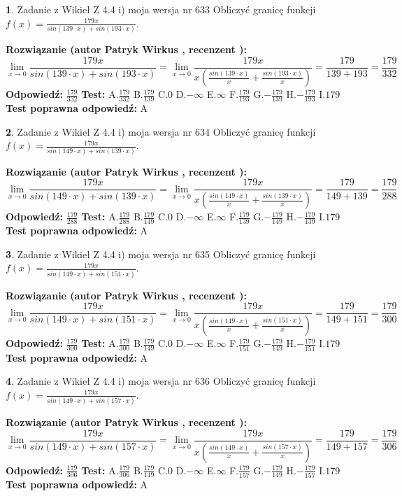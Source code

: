 \documentclass[12pt, a4paper]{article}
\theoremstyle{definition} %
\newtheorem{zad}{}
\newcommand{\zadStart}[1]{\begin{zad}#1\newline}
\newcommand{\zadStop}{\end{zad}}
\newcommand{\rozwStart}[2]{\noindent \textbf{Rozwiązanie (autor #1 , recenzent #2): }\newline}
\newcommand{\rozwStop}{\newline}
\newcommand{\odpStart}{\noindent \textbf{Odpowiedź:}\newline}
\newcommand{\odpStop}{\newline}
\newcommand{\testStart}{\noindent \textbf{Test:}\newline}
\newcommand{\testStop}{\newline}
\newcommand{\kluczStart}{\noindent \textbf{Test poprawna odpowiedź:}\newline}
\newcommand{\kluczStop}{\newline}
\begin{document}
\zadStart{Zadanie z Wikieł Z 4.4 i) moja wersja nr 633}
Obliczyć granicę funkcji $f(x)=\frac{179x}{sin(139\cdot x) +sin(193\cdot x)}$.
\zadStop
\rozwStart{Patryk Wirkus}{}
$$\lim\limits_{x\to 0}\frac{179x}{sin(139\cdot x) +sin(193\cdot x)}=\lim\limits_{x\to 0}\frac{179x}{x(\frac{sin(139\cdot x)}{x}+\frac{sin(193\cdot x)}{x})}=\frac{179}{139+193} = \frac{179}{332}$$
\rozwStop
\odpStart
$\frac{179}{332}$
\odpStop
\testStart
A.$\frac{179}{332}$
B.$\frac{179}{139}$
C.$0$
D.$-\infty$
E.$\infty$
F.$\frac{179}{193}$
G.$-\frac{179}{139}$
H.$-\frac{179}{193}$
I.$179$
\testStop
\kluczStart
A
\kluczStop



\zadStart{Zadanie z Wikieł Z 4.4 i) moja wersja nr 634}
Obliczyć granicę funkcji $f(x)=\frac{179x}{sin(149\cdot x) +sin(139\cdot x)}$.
\zadStop
\rozwStart{Patryk Wirkus}{}
$$\lim\limits_{x\to 0}\frac{179x}{sin(149\cdot x) +sin(139\cdot x)}=\lim\limits_{x\to 0}\frac{179x}{x(\frac{sin(149\cdot x)}{x}+\frac{sin(139\cdot x)}{x})}=\frac{179}{149+139} = \frac{179}{288}$$
\rozwStop
\odpStart
$\frac{179}{288}$
\odpStop
\testStart
A.$\frac{179}{288}$
B.$\frac{179}{149}$
C.$0$
D.$-\infty$
E.$\infty$
F.$\frac{179}{139}$
G.$-\frac{179}{149}$
H.$-\frac{179}{139}$
I.$179$
\testStop
\kluczStart
A
\kluczStop



\zadStart{Zadanie z Wikieł Z 4.4 i) moja wersja nr 635}
Obliczyć granicę funkcji $f(x)=\frac{179x}{sin(149\cdot x) +sin(151\cdot x)}$.
\zadStop
\rozwStart{Patryk Wirkus}{}
$$\lim\limits_{x\to 0}\frac{179x}{sin(149\cdot x) +sin(151\cdot x)}=\lim\limits_{x\to 0}\frac{179x}{x(\frac{sin(149\cdot x)}{x}+\frac{sin(151\cdot x)}{x})}=\frac{179}{149+151} = \frac{179}{300}$$
\rozwStop
\odpStart
$\frac{179}{300}$
\odpStop
\testStart
A.$\frac{179}{300}$
B.$\frac{179}{149}$
C.$0$
D.$-\infty$
E.$\infty$
F.$\frac{179}{151}$
G.$-\frac{179}{149}$
H.$-\frac{179}{151}$
I.$179$
\testStop
\kluczStart
A
\kluczStop



\zadStart{Zadanie z Wikieł Z 4.4 i) moja wersja nr 636}
Obliczyć granicę funkcji $f(x)=\frac{179x}{sin(149\cdot x) +sin(157\cdot x)}$.
\zadStop
\rozwStart{Patryk Wirkus}{}
$$\lim\limits_{x\to 0}\frac{179x}{sin(149\cdot x) +sin(157\cdot x)}=\lim\limits_{x\to 0}\frac{179x}{x(\frac{sin(149\cdot x)}{x}+\frac{sin(157\cdot x)}{x})}=\frac{179}{149+157} = \frac{179}{306}$$
\rozwStop
\odpStart
$\frac{179}{306}$
\odpStop
\testStart
A.$\frac{179}{306}$
B.$\frac{179}{149}$
C.$0$
D.$-\infty$
E.$\infty$
F.$\frac{179}{157}$
G.$-\frac{179}{149}$
H.$-\frac{179}{157}$
I.$179$
\testStop
\kluczStart
A
\kluczStop
\end{document}
